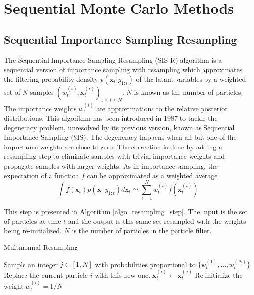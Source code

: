 \documentclass[11pt,a4,twosided,singlespacing,titlepagenumber=on]{scrreprt}
\numberwithin{equation}{chapter} %
\theoremstyle{remark}
\newcommand{\matr}[1]{\mathbf{#1}}
\begin{document}
\section{Sequential Monte Carlo Methods}
\label{section:smc}
\subsection{Sequential Importance Sampling Resampling}
The Sequential Importance Sampling Resampling (SIS-R) algorithm is a sequential version of importance sampling with resampling which approximates the filtering probability density $p(\matr{x}_t|y_{1:t})$ of the latant variables by a weighted set of $N$ samples $(w_t^{(i)}, \matr{x}_t^{(i)})_{1 \leq i \leq N}$. $N$ is known as the number of particles. The importance weights $w_t^{(i)}$ are approximations to the relative posterior distributions. This algorithm has been introduced in 1987 to tackle the degeneracy problem, unresolved by its previous version, known as Sequential Importance Sampling (SIS). The degeneracy happens when all but one of the importance weights are close to zero. The correction is done by adding a resampling step to eliminate samples with trivial importance weights and propagate samples with larger weights. As in importance sampling, the expectation of a function $f$ can be approximated as a weighted average
\begin{equation}
\int f(\matr{x}_t)p(\matr{x}_t|y_{1:t})d \matr{x}_t \simeq \sum_{i=1}^N w_t^{(i)} f(\matr{x}_t^{(i)})
\end{equation}

This step is presented in Algorithm \ref{algo_resampling_step}. The input is the set of particles at time $t$ and the output is this same set resampled with the weights being re-initialized. $N$ is the number of particles in the particle filter.
\begin{algorithm}[H]
\caption{Multinomial Resampling}\label{algo_resampling_step}
\begin{algorithmic}[1]
\Procedure{MultinomialResampling}{$(w_t^{(i)}, \matr{x}_t^{(i)})_{1 \leq i \leq N}$, $N$}
  \State Sample an integer $j \in [1,N]$ with probabilities proportional to $\{w_{t}^{(1)},..., w_{t}^{(N)}\}$
  \State Replace the current particle $i$ with this new one. $\matr{x}_t^{(i)} \gets \matr{x}_t^{(j)}$
  \State Re initialize the weight $w_t^{(i)} = 1/N$
\EndProcedure
\end{algorithmic}
\end{algorithm}
\end{document}
